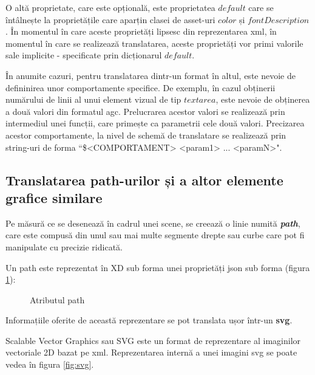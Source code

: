  O altă proprietate, care este opțională, este proprietatea $default$ care se întâlnește la proprietățile care aparțin clasei de asset-uri $color$ și $fontDescription$. În momentul în care aceste proprietăți lipsesc din reprezentarea xml, în momentul în care se realizează translatarea, aceste proprietăți vor primi valorile sale implicite - specificate prin dicționarul $default$.

 În anumite cazuri, pentru translatarea dintr-un format în altul, este nevoie de defininirea unor comportamente specifice. De exemplu, în cazul obținerii numărului de linii al unui element vizual de tip $text area$, este nevoie de obținerea a două valori din formatul agc. Prelucrarea acestor valori se realizează prin intermediul unei funcții, care primește ca parametrii cele două valori. 
 Precizarea acestor comportamente, la nivel de schemă de translatare se realizează prin string-uri de forma ``\$<COMPORTAMENT> <param1> ... <paramN>".

\subsection{Translatarea path-urilor și a altor elemente grafice similare}

Pe măsură ce se desenează în cadrul unei scene, se creează o linie numită \textbf{\textit{path}}, care este compusă din unul sau mai multe segmente drepte sau curbe care pot fi manipulate cu precizie ridicată.

Un path este reprezentat în XD sub forma unei proprietăți json sub forma (figura \ref{fig:path}):

\begin{figure}[!htbp]
\caption{Atributul path}\label{fig:path}
\end{figure}

Informațiile oferite de această reprezentare se pot translata ușor într-un \textbf{svg}. 

Scalable Vector Graphics sau SVG este un format de reprezentare al imaginilor vectoriale 2D bazat pe xml. Reprezentarea internă a unei imagini svg se poate vedea în figura \ref{fig:svg}.


